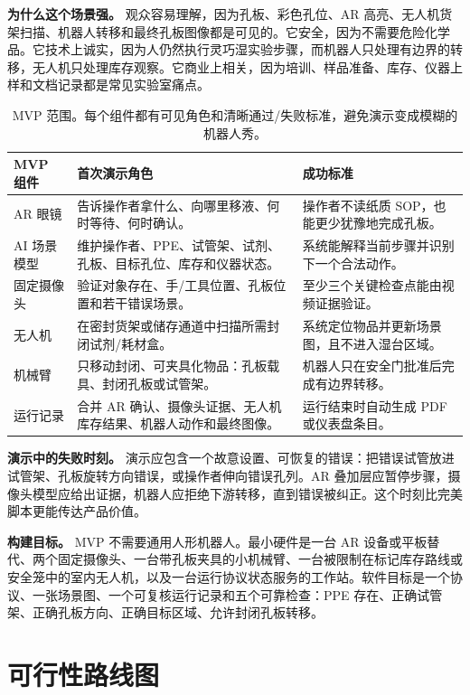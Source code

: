 \documentclass[11pt,fontset=none]{ctexart}
\begin{document}
\textbf{为什么这个场景强。} 观众容易理解，因为孔板、彩色孔位、AR 高亮、无人机货架扫描、机器人转移和最终孔板图像都是可见的。它安全，因为不需要危险化学品。它技术上诚实，因为人仍然执行灵巧湿实验步骤，而机器人只处理有边界的转移，无人机只处理库存观察。它商业上相关，因为培训、样品准备、库存、仪器上样和文档记录都是常见实验室痛点。

\begin{table}[htbp]
\centering
\small
\begin{tabularx}{\linewidth}{@{}L{2.45cm}Y Y@{}}
\toprule
\textbf{MVP 组件} & \textbf{首次演示角色} & \textbf{成功标准} \\
\midrule
AR 眼镜 & 告诉操作者拿什么、向哪里移液、何时等待、何时确认。 & 操作者不读纸质 SOP，也能更少犹豫地完成孔板。 \\
AI 场景模型 & 维护操作者、PPE、试管架、试剂、孔板、目标孔位、库存和仪器状态。 & 系统能解释当前步骤并识别下一个合法动作。 \\
固定摄像头 & 验证对象存在、手/工具位置、孔板位置和若干错误场景。 & 至少三个关键检查点能由视频证据验证。 \\
无人机 & 在密封货架或储存通道中扫描所需封闭试剂/耗材盒。 & 系统定位物品并更新场景图，且不进入湿台区域。 \\
机械臂 & 只移动封闭、可夹具化物品：孔板载具、封闭孔板或试管架。 & 机器人只在安全门批准后完成有边界转移。 \\
运行记录 & 合并 AR 确认、摄像头证据、无人机库存结果、机器人动作和最终图像。 & 运行结束时自动生成 PDF 或仪表盘条目。 \\
\bottomrule
\end{tabularx}
\caption{MVP 范围。每个组件都有可见角色和清晰通过/失败标准，避免演示变成模糊的机器人秀。}
\label{tab:mvp-scope-cn}
\end{table}

\textbf{演示中的失败时刻。} 演示应包含一个故意设置、可恢复的错误：把错误试管放进试管架、孔板旋转方向错误，或操作者伸向错误孔列。AR 叠加层应暂停步骤，摄像头模型应给出证据，机器人应拒绝下游转移，直到错误被纠正。这个时刻比完美脚本更能传达产品价值。

\textbf{构建目标。} MVP 不需要通用人形机器人。最小硬件是一台 AR 设备或平板替代、两个固定摄像头、一台带孔板夹具的小机械臂、一台被限制在标记库存路线或安全笼中的室内无人机，以及一台运行协议状态服务的工作站。软件目标是一个协议、一张场景图、一个可复核运行记录和五个可靠检查：PPE 存在、正确试管架、正确孔板方向、正确目标区域、允许封闭孔板转移。

\section{可行性路线图}
\end{document}
